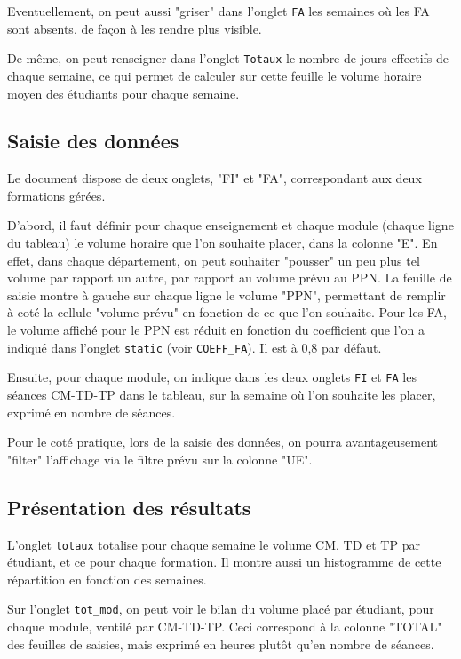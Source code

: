 \documentclass[12pt,a4paper]{article}
\begin{document}
Eventuellement, on peut aussi "griser" dans l'onglet {\tt FA} les semaines où les FA sont absents, de façon à les rendre plus visible.

De même, on peut renseigner dans l'onglet {\tt Totaux} le nombre de jours effectifs de chaque semaine, ce qui permet de calculer sur cette feuille le volume horaire moyen des étudiants pour chaque semaine.


\subsection{Saisie des données}

Le document dispose de deux onglets, "FI" et "FA", correspondant aux deux formations gérées.

D'abord, il faut définir pour chaque enseignement et chaque module (chaque ligne du tableau) le volume horaire que l'on souhaite placer, dans la colonne "E".
En effet, dans chaque département, on peut souhaiter "pousser" un peu plus tel volume par rapport un autre, par rapport au volume prévu au PPN.
La feuille de saisie montre à gauche sur chaque ligne le volume "PPN", permettant de remplir à coté la cellule "volume prévu" en fonction de ce que l'on souhaite.
Pour les FA, le volume affiché pour le PPN est réduit en fonction du coefficient que l'on a indiqué dans l'onglet {\tt static}
(voir {\tt COEFF\_FA}).
Il est à 0,8 par défaut.

Ensuite, pour chaque module, on indique dans les deux onglets {\tt FI} et {\tt FA} les séances CM-TD-TP dans le tableau, sur la semaine où l'on souhaite les placer, exprimé en nombre de séances.

Pour le coté pratique, lors de la saisie des données, on pourra avantageusement "filter" l'affichage via le filtre prévu sur la colonne "UE".

\subsection{Présentation des résultats}

L'onglet {\tt totaux} totalise pour chaque semaine le volume CM, TD et TP par étudiant, et ce pour chaque formation.
Il montre aussi un histogramme de cette répartition en fonction des semaines.

Sur l'onglet {\tt tot\_mod}, on peut voir le bilan du volume placé par étudiant, pour chaque module, ventilé par CM-TD-TP.
Ceci correspond à la colonne "TOTAL" des feuilles de saisies, mais exprimé en heures plutôt qu'en nombre de séances.
\end{document}
